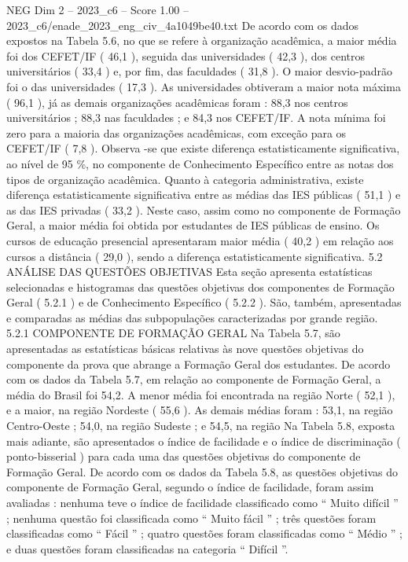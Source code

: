 \begin{textsample}{NEG Dim 2 – 2023\_c6 – Score 1.00 – 2023\_c6/enade\_2023\_eng\_civ\_4a1049be40.txt}
De acordo com os dados expostos na Tabela 5.6, no que se refere à organização acadêmica, a maior média foi dos CEFET/IF ( 46,1 ), seguida das universidades ( 42,3 ), dos centros universitários ( 33,4 ) e, por fim, das faculdades ( 31,8 ).
O maior desvio-padrão foi o das universidades ( 17,3 ).
As universidades obtiveram a maior nota máxima ( 96,1 ), já as demais organizações acadêmicas foram : 88,3 nos centros universitários ; 88,3 nas faculdades ; e 84,3 nos CEFET/IF.
A nota mínima foi zero para a maioria das organizações acadêmicas, com exceção para os CEFET/IF ( 7,8 ).
Observa -se que existe diferença estatisticamente significativa, ao nível de 95 \%, no componente de Conhecimento Específico entre as notas dos tipos de organização acadêmica.
Quanto à categoria administrativa, existe diferença estatisticamente significativa entre as médias das IES públicas ( 51,1 ) e as das IES privadas ( 33,2 ).
Neste caso, assim como no componente de Formação Geral, a maior média foi obtida por estudantes de IES públicas de ensino.
Os cursos de educação presencial apresentaram maior média ( 40,2 ) em relação aos cursos a distância ( 29,0 ), sendo a diferença estatisticamente significativa. 5.2 ANÁLISE DAS QUESTÕES OBJETIVAS Esta seção apresenta estatísticas selecionadas e histogramas das questões objetivas dos componentes de Formação Geral ( 5.2.1 ) e de Conhecimento Específico ( 5.2.2 ).
São, também, apresentadas e comparadas as médias das subpopulações caracterizadas por grande região. 5.2.1 COMPONENTE DE FORMAÇÃO GERAL Na Tabela 5.7, são apresentadas as estatísticas básicas relativas às nove questões objetivas do componente da prova que abrange a Formação Geral dos estudantes.
De acordo com os dados da Tabela 5.7, em relação ao componente de Formação Geral, a média do Brasil foi 54,2.
A menor média foi encontrada na região Norte ( 52,1 ), e a maior, na região Nordeste ( 55,6 ).
As demais médias foram : 53,1, na região Centro-Oeste ; 54,0, na região Sudeste ; e 54,5, na região Na Tabela 5.8, exposta mais adiante, são apresentados o índice de facilidade e o índice de discriminação ( ponto-bisserial ) para cada uma das questões objetivas do componente de Formação Geral.
De acordo com os dados da Tabela 5.8, as questões objetivas do componente de Formação Geral, segundo o índice de facilidade, foram assim avaliadas : nenhuma teve o índice de facilidade classificado como “ Muito difícil ” ; nenhuma questão foi classificada como “ Muito fácil ” ; três questões foram classificadas como “ Fácil ” ; quatro questões foram classificadas como “ Médio ” ; e duas questões foram classificadas na categoria “ Difícil ”.

\end{textsample}
